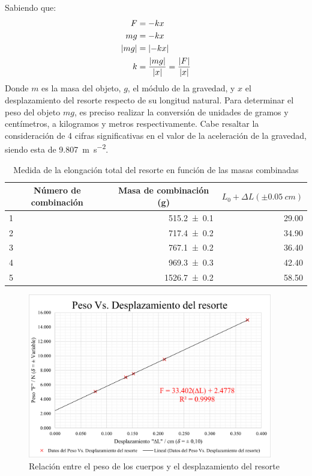 \documentclass[../main.tex]{subfiles}
\begin{document}
Sabiendo que:
\begin{align}
  F &= -kx \nonumber \\
  mg &= -kx \nonumber \\
  \abs{mg} &= \abs{-kx} \nonumber \\
  \label{eq:elastiK}
  k &= \frac{\abs{mg}}{\abs{x}} = \frac{\abs{F}}{\abs{x}}
\end{align}
Donde $m$ es la masa del objeto, $g$, el módulo de la gravedad, y $x$ el desplazamiento del resorte respecto de su longitud natural.
Para determinar el peso del objeto $mg$, es preciso realizar la conversión de unidades de gramos y centímetros, a kilogramos y metros respectivamente.
Cabe resaltar la consideración de 4 cifras significativas en el valor de la aceleración de la gravedad, siendo esta de \qty{9.807}{\metre\per\second\squared}.
\begin{table}[H]
  \caption{Medida de la elongación total del resorte en función de las masas combinadas}
  \label{tab:massToLength}
  \begin{center}
    \begin{tabular}[c]{lrr}
      \toprule
      \multicolumn{1}{c}{Número de combinación} &
      \multicolumn{1}{c}{Masa de combinación (\unit{\gram})} &
      \multicolumn{1}{c}{$L_0 + \Delta L (\pm \qty{0.05}{cm})$} \\
      \midrule
      1 & \num{515.2 +- 0.1} & \num{29.00} \\
      2 & \num{717.4 +- 0.2} & \num{34.90} \\
      3 & \num{767.1 +- 0.2} & \num{36.40} \\
      4 & \num{969.3 +- 0.3} & \num{42.40} \\
      5 & \num{1526.7 +- 0.2} & \num{58.50} \\
      \bottomrule
    \end{tabular}
  \end{center}
\end{table}
\begin{figure}
  \begin{center}
    \includegraphics[width=0.95\textwidth]{resources/resl1.png}
  \end{center}
  \caption{Relación entre el peso de los cuerpos y el desplazamiento del resorte}
  \label{fig:weightAndDelta}
\end{figure}
\end{document}
